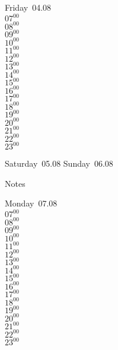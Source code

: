 \documentclass[11pt, a4paper]{book}\usepackage[]{graphicx}\usepackage[]{color}
\begin{document}
\begin{weekdaybox}
  Friday~04.08\\
  { 
  \vfill
  $07^{00}$\\
$08^{00}$\\
$09^{00}$\\
$10^{00}$\\
$11^{00}$\\
$12^{00}$\\
$13^{00}$\\
$14^{00}$\\
$15^{00}$\\
$16^{00}$\\
$17^{00}$\\
$18^{00}$\\
$19^{00}$\\
$20^{00}$\\
$21^{00}$\\
$22^{00}$\\
$23^{00}$\\
  }
\end{weekdaybox}
\begin{weekendbox}
  Saturday~05.08
  \tcblower
  Sunday~06.08
\end{weekendbox} %
\begin{notebox}
  Notes
\end{notebox}
\clearpage
\begin{headerbox}
\end{headerbox}
\begin{weekdaybox}
  Monday~07.08\\
  { 
  \vfill
  $07^{00}$\\
$08^{00}$\\
$09^{00}$\\
$10^{00}$\\
$11^{00}$\\
$12^{00}$\\
$13^{00}$\\
$14^{00}$\\
$15^{00}$\\
$16^{00}$\\
$17^{00}$\\
$18^{00}$\\
$19^{00}$\\
$20^{00}$\\
$21^{00}$\\
$22^{00}$\\
$23^{00}$\\
  }
\end{weekdaybox}
\end{document}
